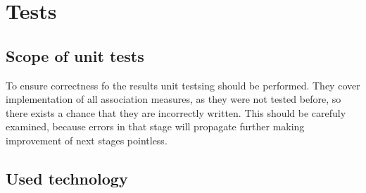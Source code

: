 \chapter{Tests}

\section{Scope of unit tests}
To ensure correctness fo the results unit testsing should be performed. They cover implementation of all association measures, 
as they were not tested before, so there exists a chance that they are incorrectly written. This should be carefuly examined, 
because errors in that stage will propagate further making improvement of next stages pointless.



\section{Used technology}

